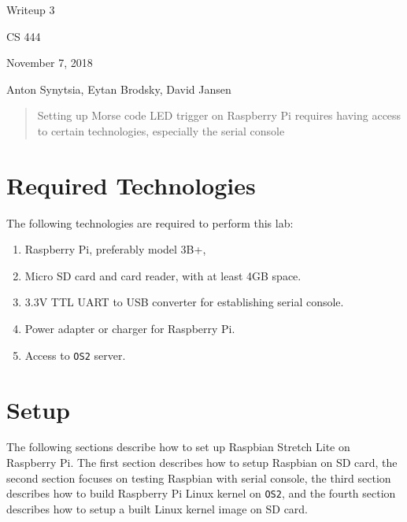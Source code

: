 \documentclass[onecolumn, draftclsnofoot, 10pt, compsoc]{IEEEtran}
\begin{document}
\begin{titlepage}
\begin{singlespace}
\centering
\scshape{
    \huge{Writeup 3}\par
    \vspace{.5in}
    \large{CS 444}\par
    \large{November 7, 2018}\par
    \vspace{.5in}
    \large{Anton Synytsia, Eytan Brodsky, David Jansen}\par
    \vspace{.5in}
    \vfill
}
\begin{abstract}
Setting up Morse code LED trigger on Raspberry Pi requires having access to certain technologies, especially the serial console
\end{abstract}
\end{singlespace}
\end{titlepage}
\newpage
{}
\tableofcontents
\clearpage

\section{Required Technologies}
The following technologies are required to perform this lab:
\begin{enumerate}
\item Raspberry Pi, preferably model 3B+,
\item Micro SD card and card reader, with at least 4GB space.
\item 3.3V TTL UART to USB converter for establishing serial console.
\item Power adapter or charger for Raspberry Pi.
\item Access to \texttt{OS2} server.
\end{enumerate}


\section{Setup}
The following sections describe how to set up Raspbian Stretch Lite on Raspberry Pi. The first section describes how to setup Raspbian on SD card, the second section focuses on testing Raspbian with serial console, the third section describes how to build Raspberry Pi Linux kernel on \texttt{OS2}, and the fourth section describes how to setup a built Linux kernel image on SD card.
\end{document}
